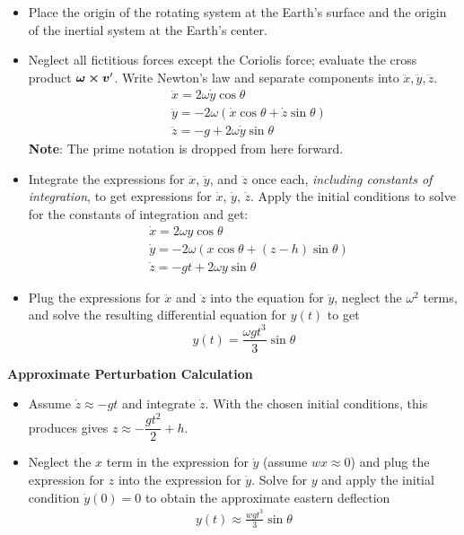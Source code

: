 \documentclass[11pt, a4paper]{article}
\begin{document}
\begin{itemize}
	\item Place the origin of the rotating system at the Earth's surface and the origin of the inertial system at the Earth's center.
	
	\item Neglect all fictitious forces except the Coriolis force; evaluate the cross product $ \bm{\omega} \cross \bm{v}' $. Write Newton's law and separate components into $ \ddot{x}, \ddot{y}, \ddot{z} $. 
	\begin{align*}
		&\ddot x = 2 \omega \dot y \cos \theta\\
		&\ddot y = - 2\omega (\dot x \cos \theta + \dot z \sin \theta)\\
		&\ddot z = - g + 2 \omega \dot y \sin \theta
	\end{align*}
	\textbf{Note}: The prime notation is dropped from here forward.
	
	\item Integrate the expressions for $ \ddot{x} $, $ \ddot{y} $, and $ \ddot{z} $ once each, \textit{including constants of integration}, to get expressions for $ \dot{x} $, $\dot{y}$, $ \dot{z} $. Apply the initial conditions to solve for the constants of integration and get:
	\begin{align*}
		&\dot{x} = 2 \omega y \cos \theta \\
		&\dot{y} = -2 \omega (x \cos \theta + (z - h) \sin \theta )\\
		&\dot{z} = -gt + 2 \omega y\sin \theta 
	\end{align*}
	
	\item Plug the expressions for $ \ddot{x} $ and $ \ddot{z} $ into the equation for $ \ddot{y} $, neglect the $ \omega^2 $ terms, and solve the resulting differential equation for $ y(t) $ to get
	\begin{equation*}
		y(t) = \frac{\omega g t^3}{3}  \sin \theta
	\end{equation*}
\end{itemize}

\textbf{Approximate Perturbation Calculation}
\begin{itemize}
	\item Assume $ \dot{z} \approx -gt $ and integrate $ \dot{z} $. With the chosen initial conditions, this produces gives $ z \approx -\dfrac{gt^2}{2} + h $.
	
	\item Neglect the $ x $ term in the expression for $ \dot{y} $ (assume $ w x \approx 0 $) and plug the expression for $ z $ into the expression for $ \dot{y} $. Solve for $ y $ and apply the initial condition $ \dot{y}(0) = 0 $ to obtain the approximate eastern deflection
	\begin{align*}
		y(t) \approx \frac{wgt^3}{3}\sin \theta
	\end{align*}
\end{itemize}
\end{document}
